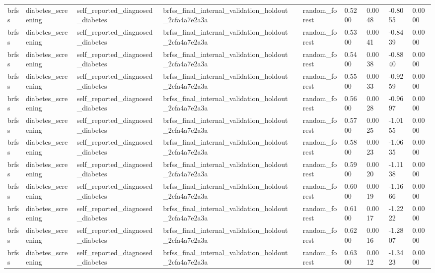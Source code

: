 \begin{tabular}{llllllllll}
brfss & diabetes\_screening & self\_reported\_diagnosed\_diabetes & brfss\_final\_internal\_validation\_holdout\_2cfa4a7e2a3a &  & random\_forest & 0.5200 & 0.0048 & -0.8055 & 0.0000 \\
brfss & diabetes\_screening & self\_reported\_diagnosed\_diabetes & brfss\_final\_internal\_validation\_holdout\_2cfa4a7e2a3a &  & random\_forest & 0.5300 & 0.0041 & -0.8439 & 0.0000 \\
brfss & diabetes\_screening & self\_reported\_diagnosed\_diabetes & brfss\_final\_internal\_validation\_holdout\_2cfa4a7e2a3a &  & random\_forest & 0.5400 & 0.0038 & -0.8840 & 0.0000 \\
brfss & diabetes\_screening & self\_reported\_diagnosed\_diabetes & brfss\_final\_internal\_validation\_holdout\_2cfa4a7e2a3a &  & random\_forest & 0.5500 & 0.0033 & -0.9259 & 0.0000 \\
brfss & diabetes\_screening & self\_reported\_diagnosed\_diabetes & brfss\_final\_internal\_validation\_holdout\_2cfa4a7e2a3a &  & random\_forest & 0.5600 & 0.0028 & -0.9697 & 0.0000 \\
brfss & diabetes\_screening & self\_reported\_diagnosed\_diabetes & brfss\_final\_internal\_validation\_holdout\_2cfa4a7e2a3a &  & random\_forest & 0.5700 & 0.0025 & -1.0155 & 0.0000 \\
brfss & diabetes\_screening & self\_reported\_diagnosed\_diabetes & brfss\_final\_internal\_validation\_holdout\_2cfa4a7e2a3a &  & random\_forest & 0.5800 & 0.0023 & -1.0635 & 0.0000 \\
brfss & diabetes\_screening & self\_reported\_diagnosed\_diabetes & brfss\_final\_internal\_validation\_holdout\_2cfa4a7e2a3a &  & random\_forest & 0.5900 & 0.0020 & -1.1138 & 0.0000 \\
brfss & diabetes\_screening & self\_reported\_diagnosed\_diabetes & brfss\_final\_internal\_validation\_holdout\_2cfa4a7e2a3a &  & random\_forest & 0.6000 & 0.0019 & -1.1666 & 0.0000 \\
brfss & diabetes\_screening & self\_reported\_diagnosed\_diabetes & brfss\_final\_internal\_validation\_holdout\_2cfa4a7e2a3a &  & random\_forest & 0.6100 & 0.0017 & -1.2222 & 0.0000 \\
brfss & diabetes\_screening & self\_reported\_diagnosed\_diabetes & brfss\_final\_internal\_validation\_holdout\_2cfa4a7e2a3a &  & random\_forest & 0.6200 & 0.0016 & -1.2807 & 0.0000 \\
brfss & diabetes\_screening & self\_reported\_diagnosed\_diabetes & brfss\_final\_internal\_validation\_holdout\_2cfa4a7e2a3a &  & random\_forest & 0.6300 & 0.0012 & -1.3423 & 0.0000 \\

\end{tabular}
